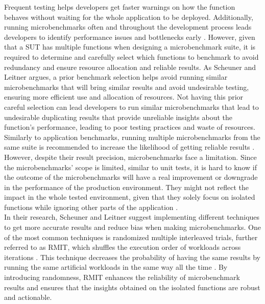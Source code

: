 Frequent testing helps developers get faster warnings on how the function behaves without waiting for the whole application to be deployed. Additionally, running microbenchmarks often and throughout the development process leads developers to identify performance issues and bottlenecks early \cite{schirmer2024elastibench}. However, given that a \ac{SUT} has multiple functions when designing a microbenchmark suite, it is required to determine and carefully select which functions to benchmark to avoid redundancy and ensure resource allocation and reliable results. As Scheuner and Leitner \cite{scheuner2018cloudBenchmarkingSuit} argues, a prior benchmark selection helps avoid running similar microbenchmarks that will bring similar results and avoid undesirable testing, ensuring more efficient use and allocation of resources. Not having this prior careful selection can lead developers to run similar microbenchmarks that lead to undesirable duplicating results that provide unreliable insights about the function's performance, leading to poor testing practices and waste of resources. \\
Similarly to application benchmarks, running multiple microbenchmarks from the same suite is recommended to increase the likelihood of getting reliable results \cite{gil2011microbenchmarkleasonslearned}. However, despite their result precision, microbenchmarks face a limitation. Since the microbenchmarks' scope is limited, similar to unit tests, it is hard to know if the outcome of the microbenchmarks will have a real improvement or downgrade in the performance of the production environment. They might not reflect the impact in the whole tested environment, given that they solely focus on isolated functions while ignoring other parts of the application \cite{grambow, grambow2021usingApplication}. \\
In their research, Scheuner and Leitner \cite{scheuner2018cloudBenchmarkingSuit} suggest implementing different techniques to get more accurate results and reduce bias when making microbenchmarks. One of the most common techniques is randomized multiple interleaved trials, further referred to as \ac{RMIT}, which shuffles the execution order of workloads across iterations  \cite{japke2023earlymicrobenchmarkcatches, scheuner2018cloudBenchmarkingSuit}. This technique decreases the probability of having the same results by running the same artificial workloads in the same way all the time \cite{abedi2017conductingrepeatable}. By introducing randomness, \ac{RMIT} enhances the reliability of microbenchmark results and ensures that the insights obtained on the isolated functions are robust and actionable. 


